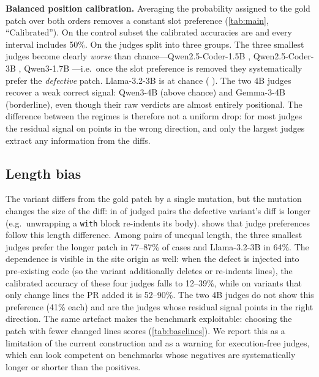

\textbf{Balanced position calibration.}  Averaging the probability assigned to
the gold patch over both orders removes a constant slot preference
(\cref{tab:main}, ``Calibrated'').  On the control subset the calibrated accuracies are
\CalRangeC{} and every interval includes 50\%.  On \RJB{} the judges split
into three groups.  The three smallest judges become clearly \emph{worse} than
chance---Qwen2.5-Coder-1.5B \CalRCoderS{} \CalCIRCoderS{}, Qwen2.5-Coder-3B
\CalRCoderM{} \CalCIRCoderM{}, Qwen3-1.7B \CalRQwenS{} \CalCIRQwenS{}---i.e.\
once the slot preference is removed they systematically prefer the
\emph{defective} patch.  Llama-3.2-3B is at chance (\CalRLlama{} \CalCIRLlama{}).
The two 4B judges recover a weak correct signal: Qwen3-4B \CalRQwenM{}
\CalCIRQwenM{} (above chance) and Gemma-3-4B \CalRGemma{} \CalCIRGemma{}
(borderline), even though their raw verdicts are almost entirely positional.
The difference between the regimes is therefore not a uniform drop: for most
judges the residual signal on \RJB{} points in the wrong direction, and only
the largest judges extract any information from the diffs.

\subsection{Length bias}
\label{sec:res-length}

The variant differs from the gold patch by a single mutation, but the mutation
changes the size of the diff: in \VarLongerShare{} of judged pairs the
defective variant's diff is longer (e.g.\ unwrapping a \texttt{with} block
re-indents its body).  \Cref{tab:length} shows that judge preferences follow
this length difference.  Among pairs of unequal length, the three smallest judges
prefer the longer patch in 77--87\% of cases and Llama-3.2-3B in 64\%.  The
dependence is visible in the site origin as well: when the defect is injected
into pre-existing code (so the variant additionally deletes or re-indents
lines), the calibrated accuracy of these four judges falls to 12--39\%, while
on variants that only change lines the PR added it is 52--90\%.  The two 4B
judges do not show this preference (41\% each) and are the judges whose
residual signal points in the right direction.  The same artefact makes the benchmark
exploitable: choosing the patch with fewer changed lines scores
\LengthHeurAcc{} (\cref{tab:baselines}).  We report this as a limitation of the
current construction and as a warning for execution-free judges, which can
look competent on benchmarks whose negatives are systematically longer or
shorter than the positives.

